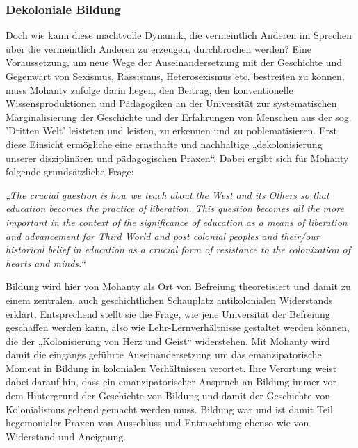\subsubsection{Dekoloniale Bildung}

Doch wie kann diese machtvolle Dynamik, die vermeintlich Anderen im Sprechen
über die vermeintlich Anderen zu erzeugen, durchbrochen werden? Eine
Voraussetzung, um neue Wege der Auseinandersetzung mit der Geschichte und
Gegenwart von Sexismus, Rassismus, Heterosexismus etc. bestreiten zu können,
muss Mohanty zufolge darin liegen, den Beitrag, den konventionelle
Wissensproduktionen und Pädagogiken an der Universität zur systematischen
Marginalisierung der Geschichte und der Erfahrungen von Menschen aus der sog.
'Dritten Welt' leisteten und leisten, zu erkennen und zu poblematisieren. Erst
diese Einsicht ermögliche eine ernsthafte und nachhaltige „dekolonisierung
unserer disziplinären und pädagogischen Praxen“\footnotemark{}. Dabei ergibt sich für Mohanty
folgende grundsätzliche Frage:

\begin{myenv}
  \textit{„The crucial question is how we teach about the West and its Others
    so that education becomes the practice of liberation. This question becomes
    all the more important in the context of the significance of education as a
    means of liberation and advancement for Third World and post colonial
    peoples and their/our historical belief in education as a crucial form of
    resistance to the colonization of hearts and minds.“\footnotemark
    }
\end{myenv}

Bildung wird hier von Mohanty als Ort von Befreiung theoretisiert und damit zu
einem zentralen, auch geschichtlichen Schauplatz antikolonialen Widerstands
erklärt. Entsprechend stellt sie die Frage, wie jene Universität der Befreiung
geschaffen werden kann, also wie Lehr-Lernverhältnisse gestaltet werden können,
die der „Kolonisierung von Herz und Geist“\footnotemark{} widerstehen.  Mit Mohanty wird
damit die eingangs geführte Auseinandersetzung um das emanzipatorische Moment
in Bildung in kolonialen Verhältnissen verortet. Ihre Verortung weist dabei
darauf hin, dass ein emanzipatorischer Anspruch an Bildung immer vor dem
Hintergrund der Geschichte von Bildung und damit der Geschichte von
Kolonialismus geltend gemacht werden muss. Bildung  war und ist damit Teil
hegemonialer Praxen von Ausschluss und Entmachtung ebenso wie von Widerstand
und Aneignung.\\


